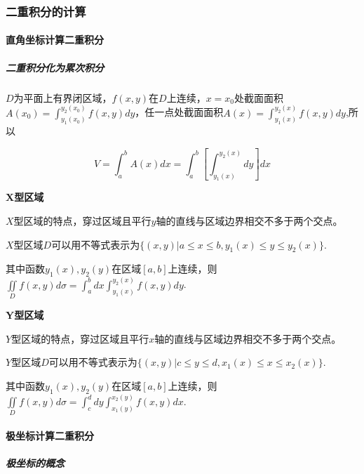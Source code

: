 \documentclass[
]{article}
\begin{document}
\hypertarget{ux4e8cux91cdux79efux5206ux7684ux8ba1ux7b97}{%
\subsubsection{二重积分的计算}\label{ux4e8cux91cdux79efux5206ux7684ux8ba1ux7b97}}

\hypertarget{ux76f4ux89d2ux5750ux6807ux8ba1ux7b97ux4e8cux91cdux79efux5206}{%
\paragraph{直角坐标计算二重积分}\label{ux76f4ux89d2ux5750ux6807ux8ba1ux7b97ux4e8cux91cdux79efux5206}}

\hypertarget{ux4e8cux91cdux79efux5206ux5316ux4e3aux7d2fux6b21ux79efux5206}{%
\subparagraph{二重积分化为累次积分}\label{ux4e8cux91cdux79efux5206ux5316ux4e3aux7d2fux6b21ux79efux5206}}

\(D\)为平面上有界闭区域，\(f(x,y)\)在\(D\)上连续，\(x=x_0\)处截面面积\(A(x_0)=\int_{y_1(x_0)}^{y_2(x_0)}f(x,y)dy\)，任一点处截面面积\(A(x)=\int_{y_1(x)}^{y_2(x)}f(x,y)dy\),所以

\[V = \int_a^bA(x)dx =\int_a^b[\int_{y_1(x)}^{y_2(x)}dy]dx\]

\textbf{X型区域}

\(X\)型区域的特点，穿过区域且平行\(y\)轴的直线与区域边界相交不多于两个交点。

\(X\)型区域\(D\)可以用不等式表示为\(\{(x,y)\vert a \le x \le  b,y_1(x)\le y\le y_2(x)\}\).

其中函数\(y_1(x),y_2(y)\)在区域\([a,b]\)上连续，则\(\iint\limits_Df(x,y)d\sigma=\int_a^bdx\int_{y_1(x)}^{y_2(x)}f(x,y)dy\).

\textbf{Y型区域}

\(Y\)型区域的特点，穿过区域且平行\(x\)轴的直线与区域边界相交不多于两个交点。

\(Y\)型区域\(D\)可以用不等式表示为\(\{(x,y)\vert c \le y \le  d,x_1(x)\le x\le x_2(x)\}\).

其中函数\(y_1(x),y_2(y)\)在区域\([a,b]\)上连续，则\(\iint\limits_Df(x,y)d\sigma=\int_c^ddy\int_{x_1(y)}^{x_2(y)}f(x,y)dx\).

\hypertarget{ux6781ux5750ux6807ux8ba1ux7b97ux4e8cux91cdux79efux5206-1}{%
\paragraph{极坐标计算二重积分}\label{ux6781ux5750ux6807ux8ba1ux7b97ux4e8cux91cdux79efux5206-1}}

\hypertarget{ux6781ux5750ux6807ux7684ux6982ux5ff5}{%
\subparagraph{极坐标的概念}\label{ux6781ux5750ux6807ux7684ux6982ux5ff5}}
\end{document}
